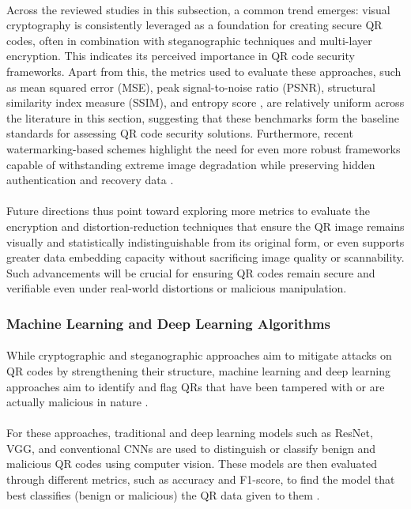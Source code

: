\documentclass[a4paper]{scl-article}
\begin{document}
\paragraph{}Across the reviewed studies in this subsection, a common trend emerges: visual cryptography is consistently leveraged as a foundation for creating secure QR codes, often in combination with steganographic techniques and multi-layer encryption. This indicates its perceived importance in QR code security frameworks. Apart from this, the metrics used to evaluate these approaches, such as mean squared error (MSE), peak signal-to-noise ratio (PSNR), structural similarity index measure (SSIM), and entropy score \cite{bhardwaj2024, narayanan2024, sofyan2024}, are relatively uniform across the literature in this section, suggesting that these benchmarks form the baseline standards for assessing QR code security solutions. Furthermore, recent watermarking-based schemes highlight the need for even more robust frameworks capable of withstanding extreme image degradation while preserving hidden authentication and recovery data \cite{lei2021}. 

\paragraph{}Future directions thus point toward exploring more metrics to evaluate the encryption and distortion-reduction techniques that ensure the QR image remains visually and statistically indistinguishable from its original form, or even supports greater data embedding capacity without sacrificing image quality or scannability. Such advancements will be crucial for ensuring QR codes remain secure and verifiable even under real-world distortions or malicious manipulation.


\subsubsection{Machine Learning and Deep Learning Algorithms}
\label{sect:rrl_3b}
\paragraph{}While cryptographic and steganographic approaches aim to mitigate attacks on QR codes by strengthening their structure, machine learning and deep learning approaches aim to identify and flag QRs that have been tampered with or are actually malicious in nature \cite{sahoo2017}.

\paragraph{}For these approaches, traditional and deep learning models such as ResNet, VGG, and conventional CNNs are used to distinguish or classify benign and malicious QR codes using computer vision. These models are then evaluated through different metrics, such as accuracy and F1-score, to find the model that best classifies (benign or malicious) the QR data given to them \cite{lourenco2023}. 
\end{document}
